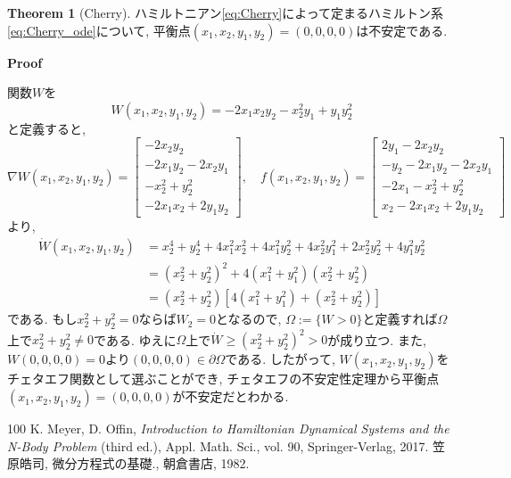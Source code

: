 \documentclass[a4paper]{ujarticle}
\makeatletter
\theoremstyle{definition}
\newtheorem{theorem}{Theorem}
\renewenvironment{proof}[1][Proof]{\par
  \pushQED{\qed}%
  \normalfont \topsep6\p@\@plus6\p@\relax
  \trivlist
  \item\relax
  {\bfseries
  #1\@addpunct{.}}\hspace\labelsep\ignorespaces
}{%
  \popQED\endtrivlist\@endpefalse
}
\makeatother
\begin{document}
    \begin{theorem}[Cherry]
        ハミルトニアン\eqref{eq:Cherry}によって定まるハミルトン系\eqref{eq:Cherry_ode}について,
        平衡点$(x_1, x_2, y_1, y_2) = (0, 0, 0, 0)$は不安定である.
    \end{theorem}
    \begin{proof}
        関数$W$を
        \[
            W(x_1, x_2, y_1, y_2) = - 2 x_1 x_2 y_2 - x_2^2 y_1 + y_1 y_2^2
        \]
        と定義すると,
        \[
            \nabla W(x_1, x_2, y_1, y_2) = 
            \begin{bmatrix}
                - 2 x_2 y_2 \\
                - 2 x_1y_2 - 2 x_2 y_1 \\
                - x_2^2 + y_2^2 \\
                - 2 x_1 x_2 + 2 y_1 y_2
            \end{bmatrix},
            \quad 
            f(x_1, x_2, y_1, y_2) =
            \begin{bmatrix}
                2 y_1 - 2 x_2 y_2 \\
                - y_2 - 2 x_1 y_2 - 2 x_2 y_1 \\
                - 2 x_1 - x_2^2 + y_2^2 \\
                x_2 - 2 x_1 x_2 + 2 y_1 y_2
            \end{bmatrix}
        \]
        より,
        \begin{align}
            \dot{W}(x_1, x_2, y_1, y_2) 
            &= x_2^4 + y_2^4 + 4 x_1^2 x_2^2 + 4 x_1^2 y_2^2 + 4 x_2^2 y_1^2 + 2 x_2^2 y_2^2 + 4 y_1^2 y_2^2 \\
            &= (x_2^2 + y_2^2)^2 + 4 (x_1^2 + y_1^2) (x_2^2 + y_2^2) \\
            &= (x_2^2 + y_2^2) [4 (x_1^2 + y_1^2) + (x_2^2 + y_2^2)]
        \end{align}
        である.
        もし$x_2^2 + y_2^2 = 0$ならば$W_2 = 0$となるので, 
        $\Omega := \{W > 0\}$と定義すれば$\Omega$上で$x_2^2 + y_2^2 \neq 0$である. 
        ゆえに$\Omega$上で$\dot{W} \geq (x_2^2 + y_2^2)^2 > 0$が成り立つ.
        また, $W(0, 0, 0, 0) = 0$より$(0, 0, 0, 0) \in \partial \Omega$である.
        したがって, $W(x_1, x_2, y_1, y_2)$をチェタエフ関数として選ぶことができ,
        チェタエフの不安定性定理から平衡点$(x_1, x_2, y_1, y_2) = (0, 0, 0, 0)$が不安定だとわかる.
    \end{proof}


    \begin{thebibliography}{100}
          K. Meyer, D. Offin, \textit{Introduction to Hamiltonian Dynamical Systems and the N-Body Problem} (third ed.),
        Appl. Math. Sci., vol. 90, Springer-Verlag, 2017.
         笠原皓司, 微分方程式の基礎., 朝倉書店, 1982.
    \end{thebibliography}
\end{document}

